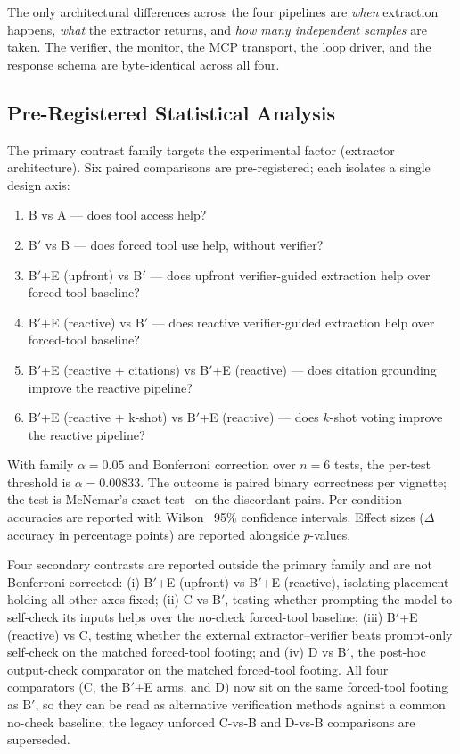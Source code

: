 The only architectural differences across the four pipelines are
\emph{when} extraction happens, \emph{what} the extractor returns,
and \emph{how many independent samples} are taken. The verifier, the
monitor, the MCP transport, the loop driver, and the response schema
are byte-identical across all four.

\subsection{Pre-Registered Statistical Analysis}
\label{sec:methods_stats}

The primary contrast family targets the experimental factor
(extractor architecture). Six paired comparisons are pre-registered;
each isolates a single design axis:

\begin{enumerate}\setlength\itemsep{2pt}
  \item B vs A --- does tool access help?
  \item B$'$ vs B --- does forced tool use help, without verifier?
  \item B$'$+E (upfront) vs B$'$ --- does upfront verifier-guided
        extraction help over forced-tool baseline?
  \item B$'$+E (reactive) vs B$'$ --- does reactive verifier-guided
        extraction help over forced-tool baseline?
  \item B$'$+E (reactive + citations) vs B$'$+E (reactive) --- does
        citation grounding improve the reactive pipeline?
  \item B$'$+E (reactive + k-shot) vs B$'$+E (reactive) --- does
        $k$-shot voting improve the reactive pipeline?
\end{enumerate}

With family $\alpha = 0.05$ and Bonferroni correction over $n = 6$
tests, the per-test threshold is $\alpha = 0.00833$. The outcome is
paired binary correctness per vignette; the test is McNemar's exact
test~\citep{mcnemar1947} on the discordant pairs. Per-condition
accuracies are reported with Wilson~\citep{wilson1927} 95\%
confidence intervals. Effect sizes ($\Delta$ accuracy in percentage
points) are reported alongside $p$-values.

Four secondary contrasts are reported outside the primary family and
are not Bonferroni-corrected: (i) B$'$+E (upfront) vs B$'$+E
(reactive), isolating placement holding all other axes fixed;
(ii) C vs B$'$, testing whether prompting the model to self-check its
inputs helps over the no-check forced-tool baseline; (iii) B$'$+E
(reactive) vs C, testing whether the external extractor--verifier
beats prompt-only self-check on the matched forced-tool footing; and
(iv) D vs B$'$, the post-hoc output-check comparator on the matched
forced-tool footing. All four comparators (C, the B$'$+E arms, and D)
now sit on the same forced-tool footing as B$'$, so they can be read
as alternative verification methods against a common no-check baseline;
the legacy unforced C-vs-B and D-vs-B comparisons are superseded.

